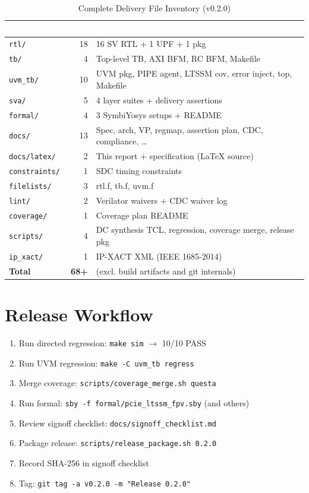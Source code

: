 \documentclass[12pt,a4paper]{report}
\newcommand{\theadcell}[1]{%
  \cellcolor{tablehead}\textcolor{white}{\textbf{#1}}}
\begin{document}
\begin{table}[H]
\centering
\caption{Complete Delivery File Inventory (v0.2.0)}
\label{tab:files}
\begin{tabular}{p{4cm}rp{7cm}}
  \toprule
  \theadcell{Directory} & \theadcell{Files} & \theadcell{Contents} \\
  \midrule
  \texttt{rtl/}        & 18 & 16 SV RTL + 1 UPF + 1 pkg \\
  \texttt{tb/}         & 4  & Top-level TB, AXI BFM, RC BFM, Makefile \\
  \texttt{uvm\_tb/}    & 10 & UVM pkg, PIPE agent, LTSSM cov, error inject, top, Makefile \\
  \texttt{sva/}        & 5  & 4 layer suites + delivery assertions \\
  \texttt{formal/}     & 4  & 3 SymbiYosys setups + README \\
  \texttt{docs/}       & 13 & Spec, arch, VP, regmap, assertion plan, CDC, compliance, \ldots \\
  \texttt{docs/latex/} & 2  & This report + specification (LaTeX source) \\
  \texttt{constraints/}& 1  & SDC timing constraints \\
  \texttt{filelists/}  & 3  & rtl.f, tb.f, uvm.f \\
  \texttt{lint/}       & 2  & Verilator waivers + CDC waiver log \\
  \texttt{coverage/}   & 1  & Coverage plan README \\
  \texttt{scripts/}    & 4  & DC synthesis TCL, regression, coverage merge, release pkg \\
  \texttt{ip\_xact/}   & 1  & IP-XACT XML (IEEE 1685-2014) \\
  \midrule
  \textbf{Total}       & \textbf{68+} & (excl. build artifacts and git internals) \\
  \bottomrule
\end{tabular}
\end{table}

\section{Release Workflow}

\begin{enumerate}[noitemsep]
  \item Run directed regression: \texttt{make sim} $\to$ 10/10 PASS
  \item Run UVM regression: \texttt{make -C uvm\_tb regress}
  \item Merge coverage: \texttt{scripts/coverage\_merge.sh questa}
  \item Run formal: \texttt{sby -f formal/pcie\_ltssm\_fpv.sby} (and others)
  \item Review signoff checklist: \texttt{docs/signoff\_checklist.md}
  \item Package release: \texttt{scripts/release\_package.sh 0.2.0}
  \item Record SHA-256 in signoff checklist
  \item Tag: \texttt{git tag -a v0.2.0 -m "Release 0.2.0"}
\end{enumerate}
\end{document}

